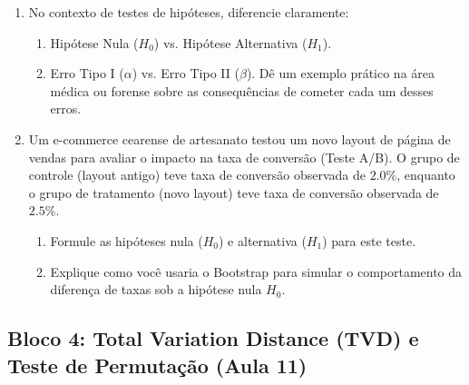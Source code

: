 \documentclass[12pt]{article}
\begin{document}
\begin{enumerate}[label=\textbf{Questão \arabic*}, resume]
    \item No contexto de testes de hipóteses, diferencie claramente:
    \begin{enumerate}[label=\alph*)]
        \item Hipótese Nula ($H_0$) vs. Hipótese Alternativa ($H_1$).
        \item Erro Tipo I ($\alpha$) vs. Erro Tipo II ($\beta$). Dê um exemplo prático na área médica ou forense sobre as consequências de cometer cada um desses erros.
    \end{enumerate}

    \item Um e-commerce cearense de artesanato testou um novo layout de página de vendas para avaliar o impacto na taxa de conversão (Teste A/B). O grupo de controle (layout antigo) teve taxa de conversão observada de $2.0\%$, enquanto o grupo de tratamento (novo layout) teve taxa de conversão observada de $2.5\%$.
    \begin{enumerate}[label=\alph*)]
        \item Formule as hipóteses nula ($H_0$) e alternativa ($H_1$) para este teste.
        \item Explique como você usaria o Bootstrap para simular o comportamento da diferença de taxas sob a hipótese nula $H_0$.
    \end{enumerate}
\end{enumerate}

\subsection*{Bloco 4: Total Variation Distance (TVD) e Teste de Permutação (Aula 11)}
\end{document}
